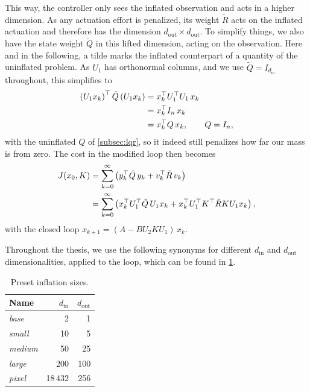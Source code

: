 This way, the controller only sees the inflated observation and acts in a higher dimension. As any actuation
effort is penalized, its weight $\tilde{R}$ acts on the inflated actuation and therefore has the dimension
$d_{\mathrm{out}} \times d_{\mathrm{out}}$. To
simplify things, we also have the state weight $\tilde{Q}$ in this lifted dimension, acting on the observation. Here and in the
following, a tilde marks the inflated counterpart of a quantity of the uninflated problem. As $U_1$ has
orthonormal columns, and we use $\tilde{Q} = I_{d_{\mathrm{in}}}$ throughout, this simplifies to
\begin{equation}
    \label{eq:lifted-state-cost}
    \begin{aligned}
    \left( U_1 x_k \right)^{\top} \tilde{Q} \left( U_1 x_k \right)
    &= x_k^{\top} U_1^{\top} U_1\, x_k \\
    &= x_k^{\top} I_n\, x_k \\
    &= x_k^{\top} Q\, x_k , \qquad Q = I_n ,
    \end{aligned}
\end{equation}
with the uninflated $Q$ of \cref{subsec:lqr}, so it indeed still penalizes how far our mass is from zero. The cost in the modified loop then
becomes
\begin{equation}
    \label{eq:inflated-cost}
    \begin{aligned}
    J(x_0, K)
    &= \sum_{k=0}^{\infty} \left( y_k^{\top} \tilde{Q}\, y_k + v_k^{\top} \tilde{R}\, v_k \right) \\
    &= \sum_{k=0}^{\infty} \left( x_k^{\top} U_1^{\top} \tilde{Q}\, U_1 x_k + x_k^{\top} U_1^{\top} K^{\top} \tilde{R} K U_1 x_k \right) ,
    \end{aligned}
\end{equation}
with the closed loop $x_{k+1} = (A - B U_2 K U_1)\, x_k$.

Throughout the thesis, we use the following synonyms for different $d_{\mathrm{in}}$ and
$d_{\mathrm{out}}$ dimensionalities, applied to the loop, which can be found in \cref{tab:inflation-sizes}.
\begin{table}[htbp]
    \centering
    \caption{Preset inflation sizes.}
    \label{tab:inflation-sizes}
    \begin{tabular}{@{}lrr@{}}
        \toprule
        Name & $d_{\mathrm{in}}$ & $d_{\mathrm{out}}$ \\
        \midrule
        \emph{base}   & 2   & 1   \\
        \emph{small}  & 10  & 5   \\
        \emph{medium} & 50  & 25  \\
        \emph{large}  & 200 & 100 \\
        \emph{pixel}  & 18\,432 & 256 \\
        \bottomrule
    \end{tabular}
\end{table}

